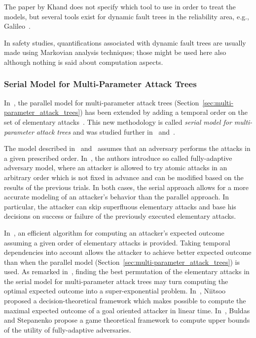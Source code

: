 \documentclass[a4paper]{article}
\begin{document}
The paper by Khand does not specify which tool to use in order to treat the
models, but several tools exist for dynamic fault trees in the reliability
area, e.g., Galileo~\cite{DuSuCo}.

In safety studies, quantifications associated with dynamic fault trees are
usually made using Markovian analysis techniques; those might be used here also
although nothing is said about computation aspects.

\subsubsection{Serial Model for Multi-Parameter Attack Trees} 
\label{sec:multi-parameter_attack_trees-serial}

In~, the parallel model for multi-parameter attack trees
(Section~\ref{sec:multi-parameter_attack_trees}) has been extended by adding a
temporal order on the set of elementary attacks~\cite{WiJu}. This new
methodology is called \emph{serial model for multi-parameter attack trees} and
was studied further in~\cite{Jurg,Niit} and~\cite{BuSt}.

The model described in~\cite{Jurg} and~\cite{Niit} assumes that an adversary
performs the attacks in a given prescribed order. In~\cite{BuSt}, the authors
introduce so called fully-adaptive adversary model, where an attacker is allowed
to try atomic attacks in an arbitrary order which is not fixed in advance and
can be modified based on the results of the previous trials. In both cases, the
serial approach allows for a more accurate modeling of an attacker's behavior
than the parallel approach. In particular, the attacker can skip superfluous
elementary attacks and base his decisions on success or failure of the
previously executed elementary attacks.

In~\cite{WiJu}, an efficient algorithm for computing an attacker's expected
outcome assuming a given order of elementary attacks is provided. Taking
temporal dependencies into account allows the attacker to achieve better
expected outcome than when the parallel model
(Section~\ref{sec:multi-parameter_attack_trees}) is used. As remarked
in~\cite{JuWi2}, finding the best permutation of the elementary attacks in the
serial model for multi-parameter attack trees may turn computing the optimal
expected outcome into a super-exponential problem. In~\cite{Niit}, Niitsoo
proposed a decision-theoretical framework which makes possible to compute the
maximal expected outcome of a goal oriented attacker in linear time.
In~\cite{BuSt}, Buldas and Stepanenko propose a game theoretical framework to
compute upper bounds of the utility of fully-adaptive adversaries.
\end{document}

